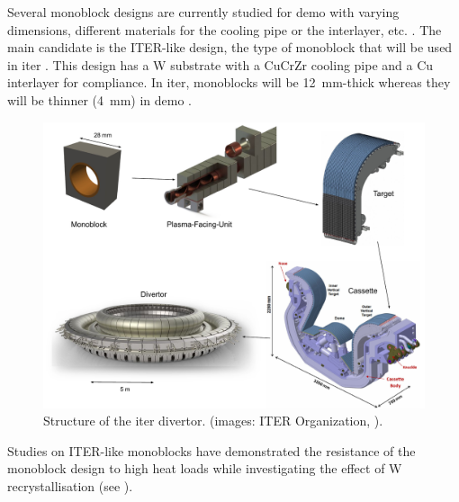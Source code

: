 Several \gls{monoblock} designs are currently studied for \gls{demo} with varying dimensions, different materials for the cooling pipe or the interlayer, etc. .
The main candidate is the ITER-like design, the type of \gls{monoblock} that will be used in \acrshort{iter} \cite{hirai_use_2016}.
This design has a \gls{W} substrate with a CuCrZr cooling pipe and a Cu interlayer for compliance.
In \acrshort{iter}, \glspl{monoblock} will be \SI{12}{mm}-thick whereas they will be thinner (\SI{4}{mm}) in \gls{demo} .

\begin{figure}
    \includegraphics[width=\linewidth]{Figures/Chapter1/monoblock_to_divertor.pdf}
    \caption{Structure of the \acrshort{iter} divertor. (images: ITER Organization, \cite{guerrini_fabrication_2021}).}
\end{figure}


Studies on ITER-like \glspl{monoblock} have demonstrated the resistance of the \gls{monoblock} design to high heat loads while investigating the effect of \Gls{W} recrystallisation  (see ).

